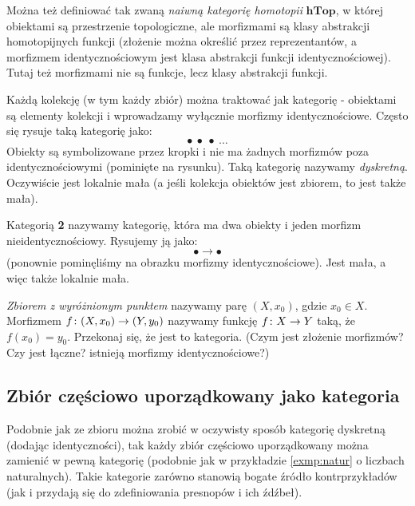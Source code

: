 \begin{exmp}
  Można też definiować tak zwaną \emph{naiwną kategorię homotopii} $\textbf{hTop}$, w której obiektami są przestrzenie topologiczne, ale morfizmami są klasy abstrakcji homotopijnych funkcji (złożenie można określić przez reprezentantów, a morfizmem identycznościowym jest klasa abstrakcji funkcji identycznościowej). Tutaj też morfizmami nie są funkcje, lecz klasy abstrakcji funkcji.
\end{exmp}

\begin{exmp}
  Każdą kolekcję (w tym każdy zbiór) można traktować jak kategorię - obiektami są elementy kolekcji i wprowadzamy wyłącznie morfizmy identycznościowe. Często się rysuje taką kategorię jako:
  $$\bullet~\bullet~\bullet~\dots $$
  Obiekty są symbolizowane przez kropki i nie ma żadnych morfizmów poza identycznościowymi (pominięte na rysunku). Taką kategorię nazywamy \emph{dyskretną}. Oczywiście jest lokalnie mała (a jeśli kolekcja obiektów jest zbiorem, to jest także mała).
\end{exmp}

\begin{exmp}
  \label{exmp:dwa}
  Kategorią \textbf{2} nazywamy kategorię, która ma dwa obiekty i jeden morfizm nieidentycznościowy. Rysujemy ją jako:
  $$\bullet \rightarrow \bullet$$
  (ponownie pominęliśmy na obrazku morfizmy identycznościowe).
  Jest mała, a więc także lokalnie mała.
\end{exmp}

\begin{exc}
  \emph{Zbiorem z wyróżnionym punktem} nazywamy parę $(X, x_0)$, gdzie $x_0\in X$. Morfizmem $f\colon (X, x_0)\to (Y, y_0)$ nazywamy funkcję $f\colon X\to Y$ taką, że $f(x_0)=y_0$. Przekonaj się, że jest to kategoria. (Czym jest złożenie morfizmów? Czy jest łączne? istnieją morfizmy identycznościowe?)
\end{exc}

\subsection{Zbiór częściowo uporządkowany jako kategoria}
\begin{idea}
  Podobnie jak ze zbioru można zrobić w oczywisty sposób kategorię dyskretną (dodając identyczności), tak każdy zbiór częściowo uporządkowany można zamienić w pewną kategorię (podobnie jak w przykładzie \ref{exmp:natur} o liczbach naturalnych). Takie kategorie zarówno stanowią bogate źródło kontrprzykładów (jak i przydają się do zdefiniowania presnopów i ich źdźbeł).
\end{idea}

